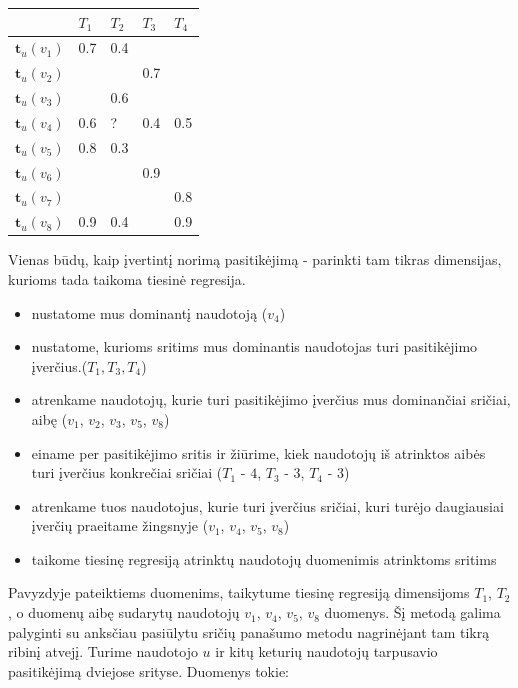 \documentclass{VUMIFInfMagistrinis}
\begin{document}
\begin{center}
	\begin{tabular}{ | l | l | l | l | l |}
		\hline
		 & $T_1$ & $T_2$ & $T_3$ & $T_4$\\ \hline
		$\boldsymbol{t}_u(v_1)$ & 0.7 & 0.4 &  & \\ \hline
		$\boldsymbol{t}_u(v_2)$ &  &  & 0.7 & \\ \hline
		$\boldsymbol{t}_u(v_3)$ &  & 0.6 &  & \\ \hline
		$\boldsymbol{t}_u(v_4)$ & 0.6 & ? & 0.4 & 0.5\\ \hline
		$\boldsymbol{t}_u(v_5)$ & 0.8 & 0.3 &  & \\ \hline
		$\boldsymbol{t}_u(v_6)$ &  &  & 0.9 & \\ \hline
		$\boldsymbol{t}_u(v_7)$ &  &  &  & 0.8\\ \hline
		$\boldsymbol{t}_u(v_8)$ & 0.9 & 0.4 &  & 0.9 \\\hline
		\hline
	\end{tabular}
\end{center}
Vienas būdų, kaip įvertintį norimą pasitikėjimą - parinkti tam tikras dimensijas, kurioms tada taikoma tiesinė regresija. 
\begin{itemize}
	\item nustatome mus dominantį naudotoją ($v_4$)
	\item nustatome, kurioms sritims mus dominantis naudotojas turi pasitikėjimo įverčius.($T_1, T_3, T_4$)
	\item atrenkame naudotojų, kurie turi pasitikėjimo įverčius mus dominančiai sričiai, aibę ($v_1$, $v_2$, $v_3$, $v_5$, $v_8$)
	\item einame per pasitikėjimo sritis ir žiūrime, kiek naudotojų iš atrinktos aibės turi įverčius konkrečiai sričiai ($T_1$ - $4$, $T_3$ - $3$, $T_4$ - $3$)
	\item atrenkame tuos naudotojus, kurie turi įverčius sričiai, kuri turėjo daugiausiai įverčių praeitame žingsnyje ($v_1$, $v_4$, $v_5$, $v_8$)
	\item taikome tiesinę regresiją atrinktų naudotojų duomenimis atrinktoms sritims
\end{itemize}
Pavyzdyje pateiktiems duomenims, taikytume tiesinę regresiją dimensijoms $T_1$, $T_2$, o duomenų aibę sudarytų naudotojų $v_1$, $v_4$, $v_5$, $v_8$ duomenys.
\newline
\indent
Šį metodą galima palyginti su anksčiau pasiūlytu sričių panašumo metodu nagrinėjant tam tikrą ribinį atvejį. Turime naudotojo $u$ ir kitų keturių naudotojų tarpusavio pasitikėjimą dviejose srityse. Duomenys tokie: 
\end{document}
